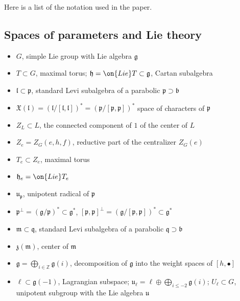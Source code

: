 \documentclass[12pt]{amsart}
\begin{document}
Here is a list of the notation used in the paper.


\subsection{Spaces of parameters and Lie theory}
   \begin{itemize}
       \item $G$, simple Lie group with Lie algebra $\mathfrak{g}$
       \item $T \subset G$, maximal torus;  $\mathfrak{h}=\on{Lie}T \subset \mathfrak{g}$, Cartan subalgebra
       \item $\mathfrak{l} \subset \mathfrak{p}$, standard Levi subalgebra of a parabolic $\mathfrak{p} \supset \mathfrak{b}$
       \item $\mathfrak{X}(\mathfrak{l})=(\mathfrak{l}/[\mathfrak{l},\mathfrak{l}])^*=(\mathfrak{p}/[\mathfrak{p},\mathfrak{p}])^*$ space of characters of $\mathfrak{p}$
       \item $Z_L \subset L$, the connected component of $1$ of the center of $L$
       \item $Z_e=Z_{G}(e,h,f)$, reductive part of the centralizer $Z_G(e)$
       \item $T_e \subset Z_e$, maximal torus
       \item $\mathfrak{h}_e=\on{Lie}T_e$
       \item $\mathfrak{u}_{\mathfrak{p}}$, unipotent radical of $\mathfrak{p}$
       \item $\mathfrak{p}^{\perp}=(\mathfrak{g}/\mathfrak{p})^* \subset \mathfrak{g}^*$, $[\mathfrak{p},\mathfrak{p}]^{\perp}=(\mathfrak{g}/[\mathfrak{p},\mathfrak{p}])^* \subset \mathfrak{g}^*$ 
       \item $\mathfrak{m} \subset \mathfrak{q}$, standard Levi subalgebra of a parabolic $\mathfrak{q} \supset \mathfrak{b}$ 
       \item $\mathfrak{z}(\mathfrak{m})$, center of $\mathfrak{m}$
       \item $\mathfrak{g}=\bigoplus_{i \in \mathbb{Z}}\mathfrak{g}(i)$, decomposition of $\mathfrak{g}$ into the weight spaces of $[h,\bullet]$
       \item $\ell \subset \mathfrak{g}(-1)$, Lagrangian subspace; $\mathfrak{u}_{\ell}=\ell \oplus \bigoplus_{i \leqslant -2} \mathfrak{g}(i)$; $U_\ell \subset G$, unipotent subgroup with the Lie algebra $\mathfrak{u}$

\end{itemize}
\end{document}
